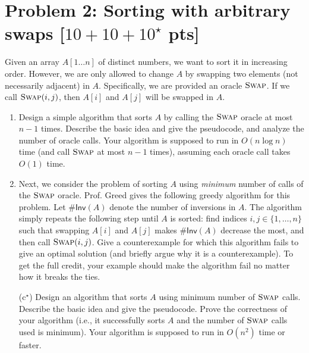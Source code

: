 \documentclass[letterpaper, 11pt]{article}
\newcommand{\1}{\mathds{1}}	%
\theoremstyle{definition}
\newcommand{\problem}[1]{\section*{Problem #1}}
\begin{document}
\problem{2: Sorting with arbitrary swaps [$10+10+10^\star$ pts]}

Given an array $A[1 \dots n]$ of distinct numbers, we want to sort it in increasing order.
However, we are only allowed to change $A$ by swapping two elements (not necessarily adjacent) in $A$.
Specifically, we are provided an oracle $\textsc{Swap}$.
If we call $\textsc{Swap}(i,j)$, then $A[i]$ and $A[j]$ will be swapped in $A$.

\begin{enumerate}
    \item Design a simple algorithm that sorts $A$ by calling the $\textsc{Swap}$ oracle at most $n-1$ times.
    Describe the basic idea and give the pseudocode, and analyze the number of oracle calls.
    Your algorithm is supposed to run in $O(n \log n)$ time (and call $\textsc{Swap}$ at most $n-1$ times), assuming each oracle call takes $O(1)$ time.
    \item Next, we consider the problem of sorting $A$ using \textit{minimum} number of calls of the $\textsc{Swap}$ oracle.
    Prof. Greed gives the following greedy algorithm for this problem.
    Let $\#\mathsf{Inv}(A)$ denote the number of inversions in $A$.
    The algorithm simply repeats the following step until $A$ is sorted: find indices $i,j \in \{1,\dots,n\}$ such that swapping $A[i]$ and $A[j]$ makes $\#\mathsf{Inv}(A)$ decrease the most, and then call $\textsc{Swap}(i,j)$.
    Give a counterexample for which this algorithm fails to give an optimal solution (and briefly argue why it is a counterexample).
    To get the full credit, your example should make the algorithm fail no matter how it breaks the ties.
    \item[(c$^\star$)] Design an algorithm that sorts $A$ using minimum number of $\textsc{Swap}$ calls.
    Describe the basic idea and give the pseudocode.
    Prove the correctness of your algorithm (i.e., it successfully sorts $A$ and the number of $\textsc{Swap}$ calls used is minimum).
    Your algorithm is supposed to run in $O(n^2)$ time or faster.
\end{enumerate}
\end{document}
